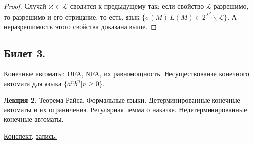 \documentclass[a4paper]{article}
\newcommand{\mybox}{%
    \collectbox{%
        \setlength{\fboxsep}{1pt}%
        \fbox{\BOXCONTENT}%
    }%
}
\theoremstyle{indented}
\theoremstyle{definition}
\theoremstyle{remark}
\begin{document}
\begin{proof}
    Случай $\varnothing \in \mathcal{L}$ сводится к предыдущему так: если свойство $\mathcal{L}$ разрешимо, то разрешимо и его отрицание, то есть, язык $\{ \sigma(M ) | L(M ) \in 2^{\Sigma^*} \backslash \mathcal{L} \}$. А неразрешимость этого свойства доказана выше.
\end{proof}



\newpage 

\subsection{Билет 3.}

Конечные автоматы: DFA, NFA, их равномощность. Несуществование конечного автомата для языка $\{a^n b^n|n \geq 0\}$.

\hrulefill

\textbf{Лекция 2.} Теорема Райса. Формальные языки. Детерминированные конечные автоматы и их ограничения. Регулярная лемма о накачке. Недетерминированные конечные автоматы.

\begin{flushright}
    \mybox{
        \href{https://users.math-cs.spbu.ru/~okhotin/teaching/tcs_fl_2021/okhotin_tcs_fl_2021_l2.pdf}{Конспект,}
        \href{https://disk.yandex.ru/d/knoQ44wLmGDwwQ/2021-2022%20учебный%20год%20(осенний%20семестр)/2%20курс/Теоретическая%20информатика/Теор%20информатика%2C%202%20курс%2C%20лекция%2C%20%2008.09.2021.mp4}{запись.}
    }
\end{flushright}
\end{document}
